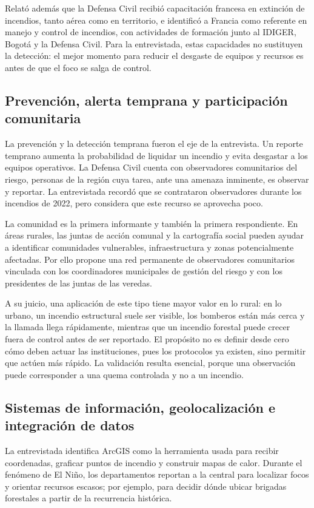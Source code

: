 Relató además que la Defensa Civil recibió capacitación francesa en extinción de incendios, tanto aérea como en territorio, e identificó a Francia como referente en manejo y control de incendios, con actividades de formación junto al IDIGER, Bogotá y la Defensa Civil. Para la entrevistada, estas capacidades no sustituyen la detección: el mejor momento para reducir el desgaste de equipos y recursos es antes de que el foco se salga de control.

\subsection{Prevención, alerta temprana y participación comunitaria}

La prevención y la detección temprana fueron el eje de la entrevista. Un reporte temprano aumenta la probabilidad de liquidar un incendio y evita desgastar a los equipos operativos. La Defensa Civil cuenta con observadores comunitarios del riesgo, personas de la región cuya tarea, ante una amenaza inminente, es observar y reportar. La entrevistada recordó que se contrataron observadores durante los incendios de 2022, pero considera que este recurso se aprovecha poco.

La comunidad es la primera informante y también la primera respondiente. En áreas rurales, las juntas de acción comunal y la cartografía social pueden ayudar a identificar comunidades vulnerables, infraestructura y zonas potencialmente afectadas. Por ello propone una red permanente de observadores comunitarios vinculada con los coordinadores municipales de gestión del riesgo y con los presidentes de las juntas de las veredas.

A su juicio, una aplicación de este tipo tiene mayor valor en lo rural: en lo urbano, un incendio estructural suele ser visible, los bomberos están más cerca y la llamada llega rápidamente, mientras que un incendio forestal puede crecer fuera de control antes de ser reportado. El propósito no es definir desde cero cómo deben actuar las instituciones, pues los protocolos ya existen, sino permitir que actúen más rápido. La validación resulta esencial, porque una observación puede corresponder a una quema controlada y no a un incendio.

\subsection{Sistemas de información, geolocalización e integración de datos}

La entrevistada identifica ArcGIS como la herramienta usada para recibir coordenadas, graficar puntos de incendio y construir mapas de calor. Durante el fenómeno de El Niño, los departamentos reportan a la central para localizar focos y orientar recursos escasos; por ejemplo, para decidir dónde ubicar brigadas forestales a partir de la recurrencia histórica.

